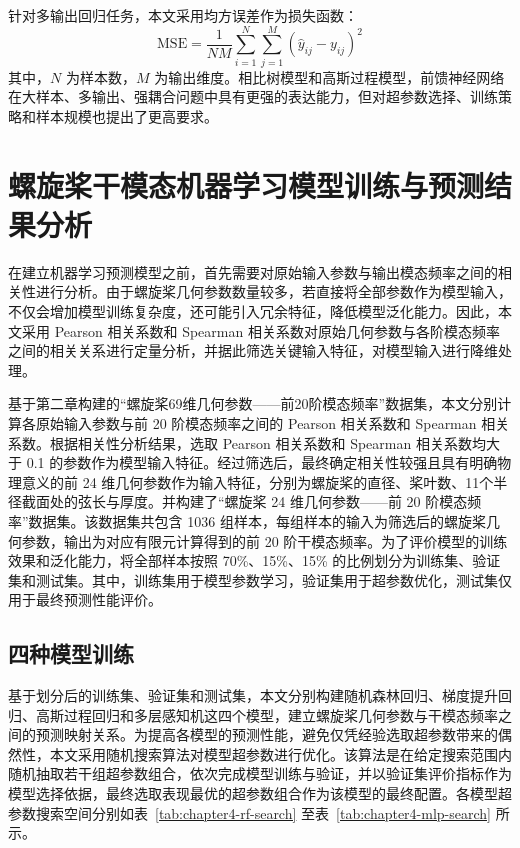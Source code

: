 针对多输出回归任务，本文采用均方误差作为损失函数：
\begin{equation}
  \mathrm{MSE} = \frac{1}{NM}\sum_{i=1}^{N}\sum_{j=1}^{M}
  \left(\hat{y}_{ij} - y_{ij}\right)^2
\end{equation}
其中，$N$ 为样本数，$M$ 为输出维度。相比树模型和高斯过程模型，前馈神经网络在大样本、多输出、强耦合问题中具有更强的表达能力，但对超参数选择、训练策略和样本规模也提出了更高要求\cite{chap4:5}。

\section{螺旋桨干模态机器学习模型训练与预测结果分析}

在建立机器学习预测模型之前，首先需要对原始输入参数与输出模态频率之间的相关性进行分析。由于螺旋桨几何参数数量较多，若直接将全部参数作为模型输入，不仅会增加模型训练复杂度，还可能引入冗余特征，降低模型泛化能力\cite{chap4:1}。因此，本文采用 Pearson 相关系数和 Spearman 相关系数对原始几何参数与各阶模态频率之间的相关关系进行定量分析，并据此筛选关键输入特征，对模型输入进行降维处理。

基于第二章构建的“螺旋桨69维几何参数——前20阶模态频率”数据集，本文分别计算各原始输入参数与前 20 阶模态频率之间的 Pearson 相关系数和 Spearman 相关系数。根据相关性分析结果，选取 Pearson 相关系数和 Spearman 相关系数均大于 0.1 的参数作为模型输入特征。经过筛选后，最终确定相关性较强且具有明确物理意义的前 24 维几何参数作为输入特征，分别为螺旋桨的直径、桨叶数、11个半径截面处的弦长与厚度。并构建了“螺旋桨 24 维几何参数——前 20 阶模态频率”数据集。该数据集共包含 1036 组样本，每组样本的输入为筛选后的螺旋桨几何参数，输出为对应有限元计算得到的前 20 阶干模态频率。为了评价模型的训练效果和泛化能力，将全部样本按照 70\%、15\%、15\% 的比例划分为训练集、验证集和测试集。其中，训练集用于模型参数学习，验证集用于超参数优化，测试集仅用于最终预测性能评价。

\subsection{四种模型训练}

基于划分后的训练集、验证集和测试集，本文分别构建随机森林回归、梯度提升回归、高斯过程回归和多层感知机这四个模型，建立螺旋桨几何参数与干模态频率之间的预测映射关系。为提高各模型的预测性能，避免仅凭经验选取超参数带来的偶然性，本文采用随机搜索算法对模型超参数进行优化\cite{chap4:2}。该算法是在给定搜索范围内随机抽取若干组超参数组合\cite{chap4:3}，依次完成模型训练与验证，并以验证集评价指标作为模型选择依据，最终选取表现最优的超参数组合作为该模型的最终配置。各模型超参数搜索空间分别如表~\ref{tab:chapter4-rf-search} 至表~\ref{tab:chapter4-mlp-search} 所示。


